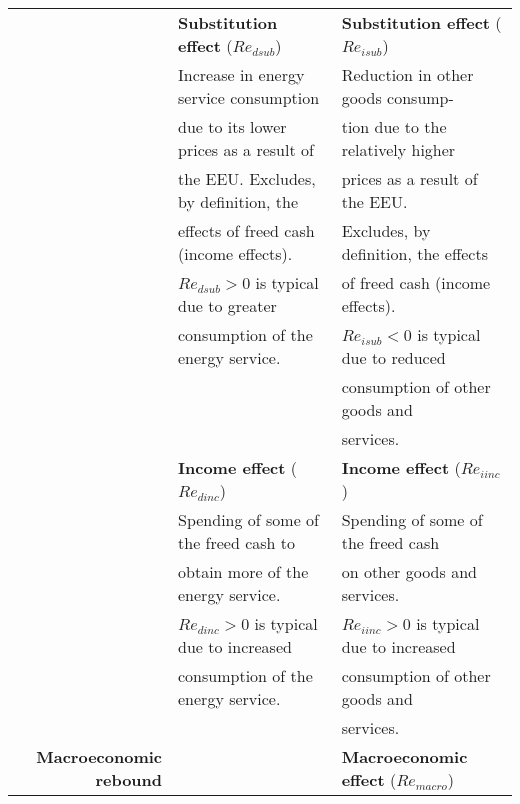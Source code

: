 \begin{table}
\begin{center}
\begin{tabular}{ r l l }
                                   & \textbf{Substitution effect} ($Re_{dsub}$)   & \textbf{Substitution effect} ($Re_{isub}$) \\
                                   & Increase in energy service consumption       & Reduction in other goods consump-  \\
                                   & due to its lower prices as a result of       & tion due to the relatively higher  \\
                                   & the EEU. Excludes, by definition, the        & prices as a result of the EEU.  \\
                                   & effects of freed cash (income effects).      & Excludes, by definition, the effects \\ 
                                   & $Re_{dsub} > 0$ is typical due to greater    & of freed cash (income effects).     \\ 
                                   & consumption of the energy service.           & $Re_{isub} < 0$ is typical due to reduced \\
                                   &                                              & consumption of other goods and   \\
                                   &                                              & services. \\
                                   \cmidrule{2-3}
                                   & \textbf{Income effect} ($Re_{dinc}$)         & \textbf{Income effect} ($Re_{iinc}$) \\
                                   & Spending of some of the freed cash to        & Spending of some of the freed cash   \\
                                   & obtain more of the energy service.           & on other goods and services.   \\
                                   & $Re_{dinc} > 0$ is typical due to increased  & $Re_{iinc} > 0$ is typical due to increased    \\ 
                                   & consumption of the energy service.           & consumption of other goods and   \\
                                   &                                              & services. \\
\midrule
\textbf{Macroeconomic rebound}     &                                              & \textbf{Macroeconomic effect} ($Re_{macro}$) \\

\end{tabular}
\end{center}
\end{table}
